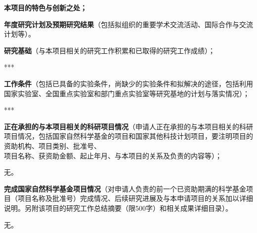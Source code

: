 \documentclass[12pt,UTF8,AutoFakeBold=3,a4paper,fontset=windows]{ctexart}
\newcommand{\kaishunumeng}[1]{{\kaishueng #1}}
\newcommand{\sihao}{\fontsize{14pt}{\baselineskip}\selectfont}
\begin{document}
\vskip 2mm
{\noindent \sihao {}}
\vskip 2mm



\vskip 2mm
{\noindent \sihao {}}
\vskip 2mm



\vskip 2mm
{\sihao \color{NsfcBlue} \kaishu \kaishunumeng{4.} {\bfseries 本项目的特色与创新之处；}}
\vskip 2mm



{\sihao \color{NsfcBlue} \kaishu \kaishunumeng{5.} {\bfseries 年度研究计划及预期研究结果}（包括拟组织的重要学术交流活动、国际合作与交流计划等）。}

\vskip 2mm
{\noindent \sihao {}}
\vskip 2mm



\vskip 2mm
{\noindent \sihao {}}
\vskip 2mm



\vskip 2mm
{\color{NsfcBlue} \sihao {}}
\vskip 2mm



\vskip 2mm
{\sihao \color{NsfcBlue} \kaishu \kaishunumeng{1.} {\bfseries 研究基础}（与本项目相关的研究工作积累和已取得的研究工作成绩）；}
\vskip 2mm

***

\vskip 2mm
{\sihao \color{NsfcBlue} \kaishu \kaishunumeng{2.} {\bfseries 工作条件}（包括已具备的实验条件，尚缺少的实验条件和拟解决的途径，包括利用国家实验室、全国重点实验室和部门重点实验室等研究基地的计划与落实情况）；}
\vskip 2mm

***

\vskip 2mm
{\sihao \color{NsfcBlue} \kaishu \kaishunumeng{3.} {\bfseries 正在承担的与本项目相关的科研项目情况}（申请人正在承担的与本项目相关的科研项目情况，包括国家自然科学基金的项目和国家其他科技计划项目，要注明项目的资助机构、项目类别、批准号、\\项目名称、获资助金额、起止年月、与本项目的关系及负责的内容等）；}
\vskip 2mm

\vspace{-0.8cm}
无。

\vskip 2mm
{\sihao \color{NsfcBlue} \kaishu \kaishunumeng{4.} {\bfseries 完成国家自然科学基金项目情况}（对申请人负责的前一个已资助期满的科学基金项目（项目名称及批准号）完成情况、后续研究进展及与本申请项目的关系加以详细说明。另附该项目的研究工作总结摘要（限500字）和相关成果详细目录）。}
\vskip 2mm

无。
\end{document}
